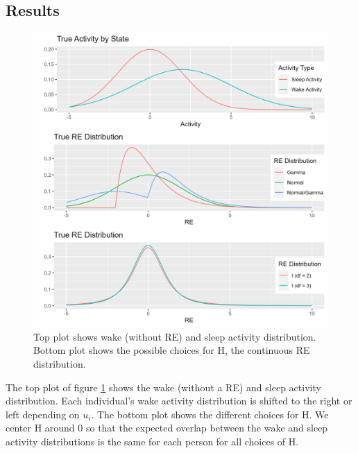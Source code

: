 \documentclass[num-refs]{wiley-article}
\begin{document}
\subsection{Results}\label{SimStudyResults}

\begin{figure}
\includegraphics[scale=.5]{Support/REdist.png}
\centering
\caption{Top plot shows wake (without RE) and sleep activity distribution. Bottom plot shows the possible choices for H, the continuous RE distribution.}
\label{REdist}
\end{figure}

The top plot of figure \ref{REdist} shows the wake (without a RE) and sleep activity distribution. Each individual's wake activity distribution is shifted to the right or left depending on $u_i$. The bottom plot shows the different choices for H. We center H around 0 so that the expected overlap between the wake and sleep activity distributions is the same for each person for all choices of H. 
\end{document}
